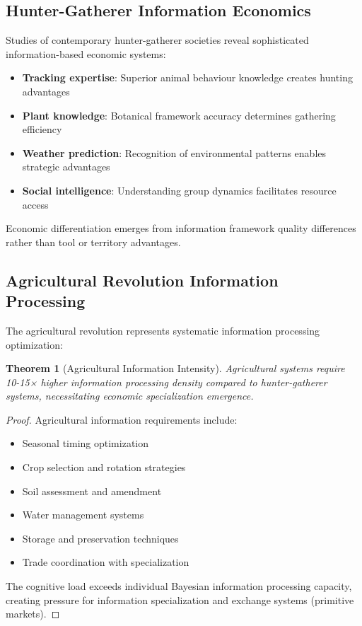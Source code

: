 \documentclass[12pt,a4paper]{article}
\newtheorem{theorem}{Theorem}
\begin{document}
\subsection{Hunter-Gatherer Information Economics}

Studies of contemporary hunter-gatherer societies reveal sophisticated information-based economic systems:

\begin{itemize}
\item \textbf{Tracking expertise}: Superior animal behaviour knowledge creates hunting advantages
\item \textbf{Plant knowledge}: Botanical framework accuracy determines gathering efficiency
\item \textbf{Weather prediction}: Recognition of environmental patterns enables strategic advantages
\item \textbf{Social intelligence}: Understanding group dynamics facilitates resource access
\end{itemize}

Economic differentiation emerges from information framework quality differences rather than tool or territory advantages.

\subsection{Agricultural Revolution Information Processing}

The agricultural revolution represents systematic information processing optimization:

\begin{theorem}[Agricultural Information Intensity]
Agricultural systems require 10-15× higher information processing density compared to hunter-gatherer systems, necessitating economic specialization emergence.
\end{theorem}

\begin{proof}
Agricultural information requirements include:
\begin{itemize}
\item Seasonal timing optimization
\item Crop selection and rotation strategies  
\item Soil assessment and amendment
\item Water management systems
\item Storage and preservation techniques
\item Trade coordination with specialization
\end{itemize}

The cognitive load exceeds individual Bayesian information processing capacity, creating pressure for information specialization and exchange systems (primitive markets).
\end{proof}
\end{document}
